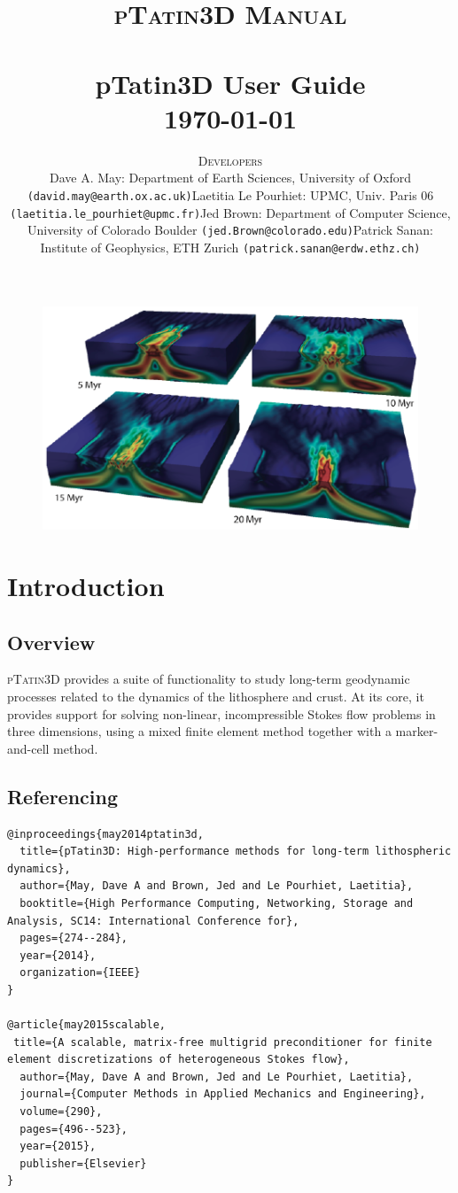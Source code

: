 \documentclass[paper=a4, fontsize=10pt,twoside]{scrartcl}
\title{	\normalsize \textsc{pTatin3D Manual} 	%
	\\[2.0cm]									%
	\HRule{2pt} \\ [0.3cm]						%
	\LARGE \textbf{{pTatin3D User Guide}}			%
	\HRule{2pt} \\ [0.5cm]						%
	\normalsize \today							%
	}
\author{
{\normalsize \textsc{Developers}}
\begin{itemize}
\item[-] Dave A. May: Department of Earth Sciences, University of Oxford \texttt{(david.may@earth.ox.ac.uk)} 
\item[-] Laetitia Le Pourhiet: UPMC, Univ. Paris 06  \texttt{(laetitia.le\_pourhiet@upmc.fr)}
\item[-] Jed Brown: Department of Computer Science, University of Colorado Boulder \texttt{(jed.Brown@colorado.edu)}
\item[-] Patrick Sanan: Institute of Geophysics, ETH Zurich \texttt{(patrick.sanan@erdw.ethz.ch)}
\end{itemize}
}
\makeatletter
\newcommand{\ptat}{{{\textsc{pTatin3D}}}}
\def\printtitle{%
    {
    	\centering \@title\par}
		 	\vspace{10mm}
	\begin{figure} [hbtp]
	\includegraphics[height=0.4\textheight]{figs/ptat3d_front_page_small.pdf}
	\end{figure}
    }
\def\printauthor{%
    {\centering \large \@author}}
\makeatother
\begin{document}
\thispagestyle{empty}%

\printtitle%
  	\vfill
\printauthor%




\newpage
{}
\tableofcontents{}

\newpage


\section{Introduction}

\subsection{Overview}
{\ptat} provides a suite of functionality to study long-term geodynamic processes related to the dynamics of the lithosphere and crust.
At its core, it provides support for solving non-linear, incompressible Stokes flow problems in three dimensions, using a mixed finite element method together with a marker-and-cell method.

\subsection{Referencing}

\begin{lstlisting}
@inproceedings{may2014ptatin3d,
  title={pTatin3D: High-performance methods for long-term lithospheric dynamics},
  author={May, Dave A and Brown, Jed and Le Pourhiet, Laetitia},
  booktitle={High Performance Computing, Networking, Storage and Analysis, SC14: International Conference for},
  pages={274--284},
  year={2014},
  organization={IEEE}
}

@article{may2015scalable,
 title={A scalable, matrix-free multigrid preconditioner for finite element discretizations of heterogeneous Stokes flow},
  author={May, Dave A and Brown, Jed and Le Pourhiet, Laetitia},
  journal={Computer Methods in Applied Mechanics and Engineering},
  volume={290},
  pages={496--523},
  year={2015},
  publisher={Elsevier}
}
\end{lstlisting}

\end{document}
